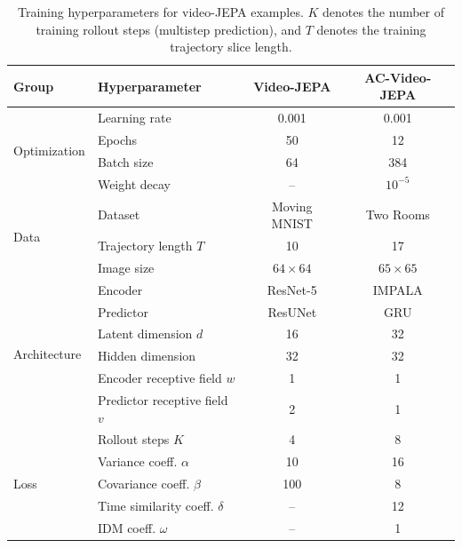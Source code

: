 \documentclass{article}
\begin{document}
\begin{table}[h]
\centering
\caption{Training hyperparameters for video-JEPA examples. $K$ denotes the number of training rollout steps (multistep prediction), and $T$ denotes the training trajectory slice length.}
\label{tab:video_hyperparams}
\begin{tabular}{llcc}
\toprule
\textbf{Group} & \textbf{Hyperparameter} & \textbf{Video-JEPA} & \textbf{AC-Video-JEPA} \\
\midrule
\multirow{4}{*}{Optimization} & Learning rate & 0.001 & 0.001 \\
 & Epochs & 50 & 12 \\
 & Batch size & 64 & 384 \\
 & Weight decay & -- & $10^{-5}$ \\
\midrule
\multirow{3}{*}{Data} & Dataset & Moving MNIST & Two Rooms \\
 & Trajectory length $T$ & 10 & 17 \\
 & Image size & $64 \times 64$ & $65 \times 65$ \\
\midrule
\multirow{6}{*}{Architecture} & Encoder & ResNet-5 & IMPALA \\
 & Predictor & ResUNet & GRU \\
 & Latent dimension $d$ & 16 & 32 \\
 & Hidden dimension & 32 & 32 \\
 & Encoder receptive field $w$ & 1 & 1 \\
 & Predictor receptive field $v$ & 2 & 1 \\
\midrule
\multirow{5}{*}{Loss} & Rollout steps $K$ & 4 & 8 \\
 & Variance coeff. $\alpha$ & 10 & 16 \\
 & Covariance coeff. $\beta$ & 100 & 8 \\
 & Time similarity coeff. $\delta$ & -- & 12 \\
 & IDM coeff. $\omega$ & -- & 1 \\
\bottomrule
\end{tabular}
\end{table}
\end{document}
